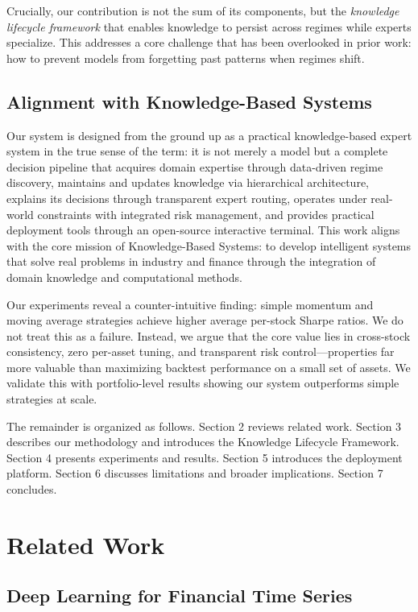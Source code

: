 \documentclass[review]{elsarticle}
\begin{document}
Crucially, our contribution is not the sum of its components, but the \textit{knowledge lifecycle framework} that enables knowledge to persist across regimes while experts specialize. This addresses a core challenge that has been overlooked in prior work: how to prevent models from forgetting past patterns when regimes shift.

\subsection{Alignment with Knowledge-Based Systems}

Our system is designed from the ground up as a practical knowledge-based expert system in the true sense of the term: it is not merely a model but a complete decision pipeline that acquires domain expertise through data-driven regime discovery, maintains and updates knowledge via hierarchical architecture, explains its decisions through transparent expert routing, operates under real-world constraints with integrated risk management, and provides practical deployment tools through an open-source interactive terminal. This work aligns with the core mission of Knowledge-Based Systems: to develop intelligent systems that solve real problems in industry and finance through the integration of domain knowledge and computational methods.

Our experiments reveal a counter-intuitive finding: simple momentum and moving average strategies achieve higher average per-stock Sharpe ratios. We do not treat this as a failure. Instead, we argue that the core value lies in cross-stock consistency, zero per-asset tuning, and transparent risk control---properties far more valuable than maximizing backtest performance on a small set of assets. We validate this with portfolio-level results showing our system outperforms simple strategies at scale.

The remainder is organized as follows. Section 2 reviews related work. Section 3 describes our methodology and introduces the Knowledge Lifecycle Framework. Section 4 presents experiments and results. Section 5 introduces the deployment platform. Section 6 discusses limitations and broader implications. Section 7 concludes.

\section{Related Work}

\subsection{Deep Learning for Financial Time Series}
\end{document}
